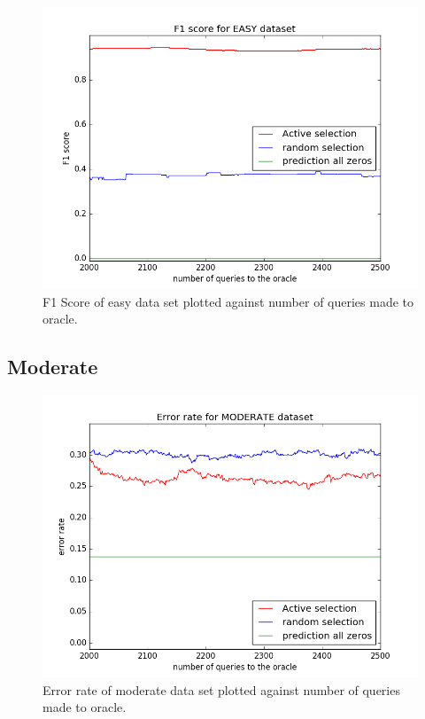 \documentclass[paper=a4, fontsize=11pt]{scrartcl}
\numberwithin{equation}{section}    %
\numberwithin{figure}{section}      %
\numberwithin{table}{section}       %
\numberwithin{equation}{section}    %
\numberwithin{figure}{section}      %
\numberwithin{table}{section}       %
\begin{document}
\begin{figure}[!htb]
  \centering
  \includegraphics[scale = 0.5]{figures/f1_easy.png}
      \caption{F1 Score of easy data set plotted against number of queries made to oracle.}
      \label{easyf}
\end{figure}



\FloatBarrier
\subsection{Moderate}

\begin{figure}[!htb]
  \centering
  \includegraphics[scale = 0.5]{figures/error_moderate.png}
      \caption{Error rate of moderate data set plotted against number of queries made to oracle.}
      \label{moderror}
\end{figure}
\end{document}
